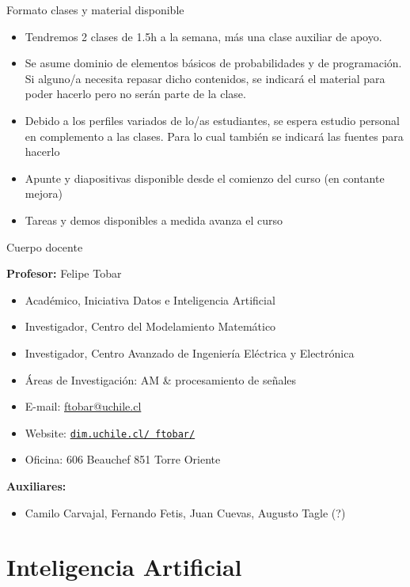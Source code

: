 \documentclass[9pt]{beamer}
\begin{document}
\begin{frame}{Formato clases y material disponible}


\begin{itemize}
  \item Tendremos 2 clases de 1.5h a la semana, más una clase auxiliar de apoyo. 
  \item Se asume dominio de elementos básicos de probabilidades y de programación. Si alguno/a necesita repasar dicho contenidos, se indicará el material para poder hacerlo pero no serán parte de la clase. 
  \item Debido a los perfiles variados de lo/as estudiantes, se espera estudio personal en complemento a las clases. Para lo cual también se indicará las fuentes para hacerlo
  \item Apunte y diapositivas disponible desde el comienzo del curso (en contante mejora)
  \item Tareas y demos disponibles a medida avanza el curso
\end{itemize}
\vfill


\end{frame}


\begin{frame}{Cuerpo docente}

\textbf{Profesor:} Felipe Tobar
\begin{itemize}
  \item Académico, Iniciativa Datos e Inteligencia Artificial 
  \item Investigador, Centro del Modelamiento Matemático 
  \item Investigador, Centro Avanzado de Ingeniería Eléctrica y Electrónica
  \item Áreas de Investigación: AM \& procesamiento de señales
  \item E-mail: \url{ftobar@uchile.cl}
  \item Website: \href{http://www.dim.uchile.cl/~ftobar/}{\tt dim.uchile.cl/~ftobar/} 
  \item Oficina: 606 Beauchef 851 Torre Oriente
\end{itemize}

\vfill
\textbf{Auxiliares:}
\begin{itemize}
  \item Camilo Carvajal, Fernando Fetis, Juan Cuevas, Augusto Tagle (?)
\end{itemize}


\end{frame}
\section{Inteligencia Artificial}
\end{document}
